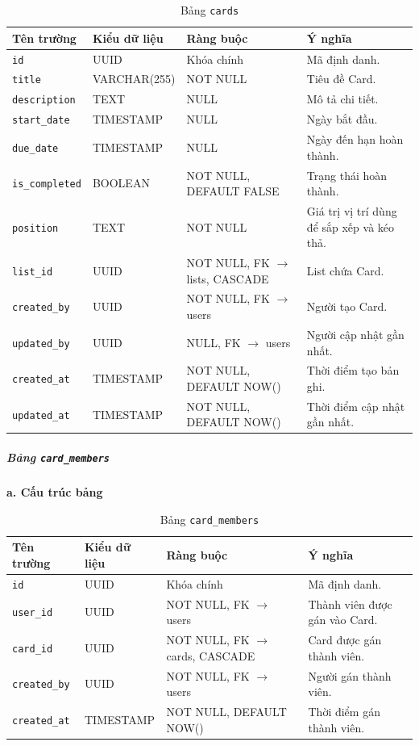 \begin{table}[H]
\centering
\begin{tabular}{|p{3cm}|p{3.5cm}|p{3.5cm}|p{4cm}|}
\hline
\textbf{Tên trường} & \textbf{Kiểu dữ liệu} & \textbf{Ràng buộc} & \textbf{Ý nghĩa} \\
\hline
\texttt{id} & UUID & Khóa chính & Mã định danh. \\
\hline
\texttt{title} & VARCHAR(255) & NOT NULL & Tiêu đề Card. \\
\hline
\texttt{description} & TEXT & NULL & Mô tả chi tiết. \\
\hline
\texttt{start\_date} & TIMESTAMP & NULL & Ngày bắt đầu. \\
\hline
\texttt{due\_date} & TIMESTAMP & NULL & Ngày đến hạn hoàn thành. \\
\hline
\texttt{is\_completed} & BOOLEAN & NOT NULL, DEFAULT FALSE & Trạng thái hoàn thành. \\
\hline
\texttt{position} & TEXT & NOT NULL & Giá trị vị trí dùng để sắp xếp và kéo thả. \\
\hline
\texttt{list\_id} & UUID & NOT NULL, FK $\rightarrow$ lists, CASCADE & List chứa Card. \\
\hline
\texttt{created\_by} & UUID & NOT NULL, FK $\rightarrow$ users & Người tạo Card. \\
\hline
\texttt{updated\_by} & UUID & NULL, FK $\rightarrow$ users & Người cập nhật gần nhất. \\
\hline
\texttt{created\_at} & TIMESTAMP & NOT NULL, DEFAULT NOW() & Thời điểm tạo bản ghi. \\
\hline
\texttt{updated\_at} & TIMESTAMP & NOT NULL, DEFAULT NOW() & Thời điểm cập nhật gần nhất. \\
\hline
\end{tabular}
\caption{Bảng \texttt{cards}}
\label{tab:db_cards}
\end{table}


\subparagraph{Bảng \texttt{card\_members}} \mbox{}

\hspace{1.5em}\textbf{a. Cấu trúc bảng}

\begin{table}[H]
\centering
\begin{tabular}{|p{3cm}|p{3.5cm}|p{3.5cm}|p{4cm}|}
\hline
\textbf{Tên trường} & \textbf{Kiểu dữ liệu} & \textbf{Ràng buộc} & \textbf{Ý nghĩa} \\
\hline
\texttt{id} & UUID & Khóa chính & Mã định danh. \\
\hline
\texttt{user\_id} & UUID & NOT NULL, FK $\rightarrow$ users & Thành viên được gán vào Card. \\
\hline
\texttt{card\_id} & UUID & NOT NULL, FK $\rightarrow$ cards, CASCADE & Card được gán thành viên. \\
\hline
\texttt{created\_by} & UUID & NOT NULL, FK $\rightarrow$ users & Người gán thành viên. \\
\hline
\texttt{created\_at} & TIMESTAMP & NOT NULL, DEFAULT NOW() & Thời điểm gán thành viên. \\
\hline
\end{tabular}
\caption{Bảng \texttt{card\_members}}
\label{tab:db_card_members}
\end{table}

